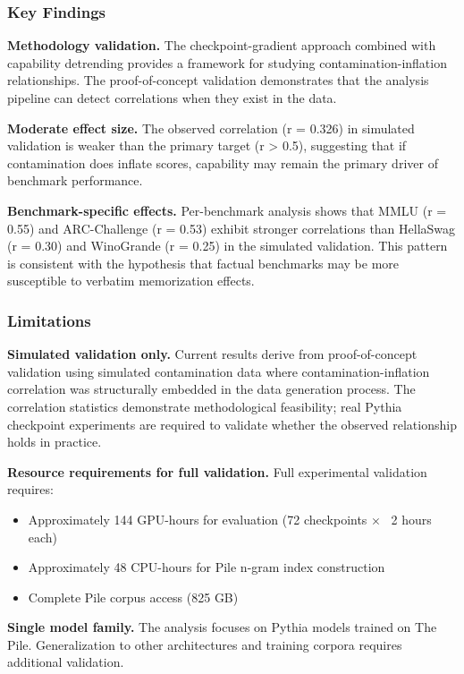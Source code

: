 
\subsubsection{Key Findings}

\textbf{Methodology validation.} The checkpoint-gradient approach combined with capability detrending provides a framework for studying contamination-inflation relationships. The proof-of-concept validation demonstrates that the analysis pipeline can detect correlations when they exist in the data.

\textbf{Moderate effect size.} The observed correlation (r = 0.326) in simulated validation is weaker than the primary target (r > 0.5), suggesting that if contamination does inflate scores, capability may remain the primary driver of benchmark performance.

\textbf{Benchmark-specific effects.} Per-benchmark analysis shows that MMLU (r = 0.55) and ARC-Challenge (r = 0.53) exhibit stronger correlations than HellaSwag (r = 0.30) and WinoGrande (r = 0.25) in the simulated validation. This pattern is consistent with the hypothesis that factual benchmarks may be more susceptible to verbatim memorization effects.

\subsubsection{Limitations}

\textbf{Simulated validation only.} Current results derive from proof-of-concept validation using simulated contamination data where contamination-inflation correlation was structurally embedded in the data generation process. The correlation statistics demonstrate methodological feasibility; real Pythia checkpoint experiments are required to validate whether the observed relationship holds in practice.

\textbf{Resource requirements for full validation.} Full experimental validation requires:
\begin{itemize}
\item Approximately 144 GPU-hours for evaluation (72 checkpoints $\times$ ~2 hours each)
\item Approximately 48 CPU-hours for Pile n-gram index construction
\item Complete Pile corpus access (825 GB)
\end{itemize}

\textbf{Single model family.} The analysis focuses on Pythia models trained on The Pile. Generalization to other architectures and training corpora requires additional validation.

